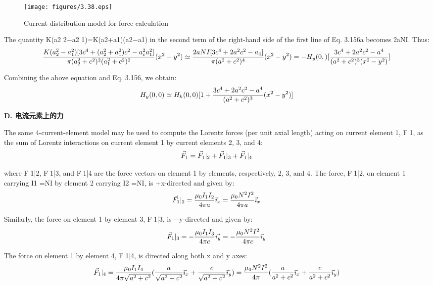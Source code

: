 \begin{figure}[htbp]
	\centering
	\texttt{[image: figures/3.38.eps]}
	\caption{Current distribution model for force calculation}
\end{figure}

The quantity K(a2 2−a2 1)=K(a2+a1)(a2−a1) in the second term of the right-hand
side of the first line of Eq. 3.156a becomes 2aNI. Thus:
$$
\frac{K(a_{2}^{2}-a_{1}^{2})[3c^{4}+(a_{2}^{2}+a_{1}^{2})c^{2}-a_{c}^{2}a_{1}^{2}]}{\pi(a_{2}^{2}+c^{2})^{2}(a_{1}^{2}+c^{2})^{2}}(x^{2}-y^{2})\simeq\frac{2aNI[3c^{4}+2a^{2}c^{2}-a_{4}]}{\pi(a^{2}+c^{2})^{4}}(x^{2}-y^{2})\\
=-H_{y}(0,)[\frac{3c^{4}+2a^{2}c^{2}-a^{4}}{(a^{2}+c^{2})^{3}(x^{2}-y^{2})}]\\
$$

Combining the above equation and Eq. 3.156, we obtain:
$$
H_{y}(0,0)\simeq H_{h}(0,0)[1+\frac{3c^{4}+2a^{2}c^{2}-a^{4}}{(a^{2}+c^{2})^{3}}(x^{2}-y^{2})]\\%
$$

\textbf{D. 电流元素上的力}

The same 4-current-element model may be used to compute the Lorentz forces
(per unit axial length) acting on current element 1, F1, as the sum of Lorentz
interactions on current element 1 by current elements 2, 3, and 4:
$$
\vec{F}_{1}=\vec{F}_{1}|_{2}+\vec{F}_{1}|_{3}+\vec{F}_{1}|_{4}\\%
$$

where F1|2, F1|3, and F1|4 are the force vectors on element 1 by elements, respectively, 2, 3, and 4.
The force, F1|2, on element 1 carrying I1 =NI by element 2 carrying I2 =NI, is
+x-directed and given by:
$$
\vec{F}_{1}|_{2}=\frac{\mu_{0}I_{1}I_{2}}{4\pi a}\vec{\imath}_{x}=\frac{\mu_{0}N^{2}I^{2}}{4\pi a}\vec{\imath}_{x}\\%
$$

Similarly, the force on element 1 by element 3, F1|3, is −y-directed and given by:
$$
\vec{F}_{1}|_{3}=-\frac{\mu_{0}I_{1}I_{3}}{4\pi c}\vec{\imath_{y}}=-\frac{\mu_{0}N^{2}I^{2}}{4\pi c}\vec{\imath}_{y}\\%
$$

The force on element 1 by element 4, F1|4, is directed along both x and y axes:
$$
\vec{F}_{1}|_{4}=\frac{\mu_{0}I_{1}I_{4}}{4\pi\sqrt{a^{2}+c^{2}}}(\frac{a}{\sqrt{a^{2}+c^{2}}}\vec{\imath}_{x}+\frac{c}{\sqrt{a^{2}+c^{2}}}\vec{\imath}_{y})\\
=\frac{\mu_{0}N^{2}I^{2}}{4\pi}(\frac{a}{a^{2}+c^{2}}\vec{\imath}_{x}+\frac{c}{a^{2}+c^{2}}\vec{\imath}_{y})\\%
$$

